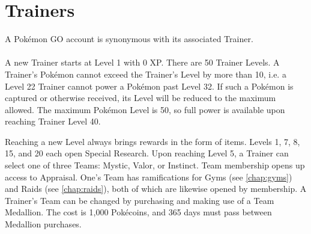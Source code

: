 \chapter{Trainers}
A Pokémon GO account is synonymous with its associated Trainer.\\
\\
A new Trainer starts at Level 1 with 0 XP.
There are 50 Trainer Levels.
A Trainer's Pokémon cannot exceed the Trainer's Level by more than 10,
  i.e. a Level 22 Trainer cannot power a Pokémon past Level 32.
If such a Pokémon is captured or otherwise received, its Level will be
  reduced to the maximum allowed.
The maximum Pokémon Level is 50, so full power is available upon reaching
  Trainer Level 40.

Reaching a new Level always brings rewards in the form of items.
Levels 1, 7, 8, 15, and 20 each open Special Research.
Upon reaching Level 5, a Trainer can select one of three Teams:
 Mystic, Valor, or Instinct.
Team membership opens up access to Appraisal.
One's Team has ramifications for Gyms (see \autoref{chap:gyms}) and Raids (see \autoref{chap:raids}),
  both of which are likewise opened by membership.
A Trainer's Team can be changed by purchasing and making use of a Team Medallion.
The cost is 1,000 Pokécoins, and 365 days must pass between Medallion purchases.

